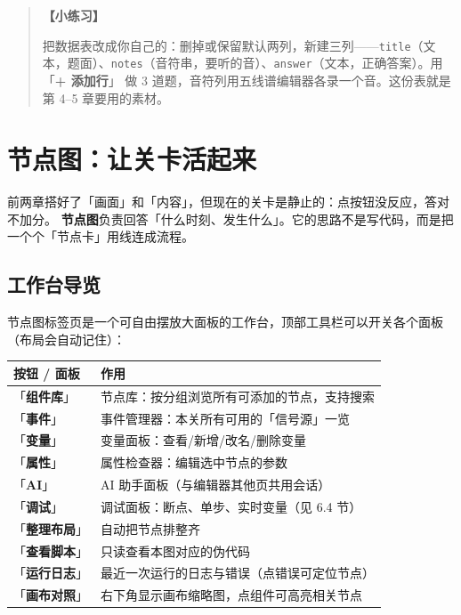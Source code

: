 \documentclass[UTF8,a4paper,zihao=-4]{ctexart}
\newcommand{\code}[1]{\texttt{#1}}   %
\newcommand{\ui}[1]{「\textbf{#1}」}  %
\newenvironment{practice}{%
  \begin{quote}\small\textbf{【小练习】}\ignorespaces
}{\end{quote}}
\begin{document}
\begin{practice}
把数据表改成你自己的：删掉或保留默认两列，新建三列——\code{title}（文本，题面）、\code{notes}（音符串，要听的音）、\code{answer}（文本，正确答案）。用 \ui{+ 添加行} 做 3 道题，音符列用五线谱编辑器各录一个音。这份表就是第 4--5 章要用的素材。
\end{practice}

\section{节点图：让关卡活起来}

前两章搭好了「画面」和「内容」，但现在的关卡是静止的：点按钮没反应，答对不加分。
\textbf{节点图}负责回答「什么时刻、发生什么」。它的思路不是写代码，而是把一个个「节点卡」用线连成流程。

\subsection{工作台导览}

节点图标签页是一个可自由摆放大面板的工作台，顶部工具栏可以开关各个面板（布局会自动记住）：

\begin{center}
\begin{tabular}{ll}
\toprule
按钮 / 面板 & 作用 \\
\midrule
\ui{组件库} & 节点库：按分组浏览所有可添加的节点，支持搜索 \\
\ui{事件} & 事件管理器：本关所有可用的「信号源」一览 \\
\ui{变量} & 变量面板：查看/新增/改名/删除变量 \\
\ui{属性} & 属性检查器：编辑选中节点的参数 \\
\ui{AI} & AI 助手面板（与编辑器其他页共用会话） \\
\ui{调试} & 调试面板：断点、单步、实时变量（见 6.4 节） \\
\ui{整理布局} & 自动把节点排整齐 \\
\ui{查看脚本} & 只读查看本图对应的伪代码 \\
\ui{运行日志} & 最近一次运行的日志与错误（点错误可定位节点） \\
\ui{画布对照} & 右下角显示画布缩略图，点组件可高亮相关节点 \\
\bottomrule
\end{tabular}
\end{center}
\end{document}
